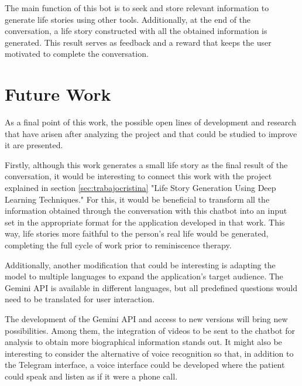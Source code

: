 The main function of this bot is to seek and store relevant information to generate life stories using other tools. Additionally, at the end of the conversation, a life story constructed with all the obtained information is generated. This result serves as feedback and a reward that keeps the user motivated to complete the conversation.

\section{Future Work}
As a final point of this work, the possible open lines of development and research that have arisen after analyzing the project and that could be studied to improve it are presented.

Firstly, although this work generates a small life story as the final result of the conversation, it would be interesting to connect this work with the project explained in section \ref{sec:trabajocristina} "Life Story Generation Using Deep Learning Techniques." For this, it would be beneficial to transform all the information obtained through the conversation with this chatbot into an input set in the appropriate format for the application developed in that work. This way, life stories more faithful to the person's real life would be generated, completing the full cycle of work prior to reminiscence therapy.

Additionally, another modification that could be interesting is adapting the model to multiple languages to expand the application's target audience. The Gemini API is available in different languages, but all predefined questions would need to be translated for user interaction.

The development of the Gemini API and access to new versions will bring new possibilities. Among them, the integration of videos to be sent to the chatbot for analysis to obtain more biographical information stands out. It might also be interesting to consider the alternative of voice recognition so that, in addition to the Telegram interface, a voice interface could be developed where the patient could speak and listen as if it were a phone call.
